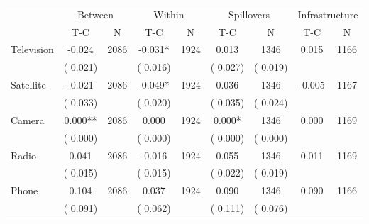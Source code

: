 
\begin{tabular}{l*{8}{c}}\hline&\multicolumn{2}{c}{Between}&\multicolumn{2}{c}{Within}&\multicolumn{2}{c}{Spillovers}&\multicolumn{2}{c}{Infrastructure}\\ \cmidrule(r){2-3}\cmidrule(l){4-5}\cmidrule(l){6-7}\cmidrule(l){8-9} & {T-C} & {N} & {T-C} & {N}  & {T-C}  & {N} & {T-C}  & {N} \\ \midrule
Television        &             -0.024      &       2086       &             -0.031*      &       1924       &              0.013      &       1346  &        0.015 &       1166       \\
                       &       (       0.021)            &                               &       (       0.016)            &                               &       (       0.027)            &       (       0.019) &                  \\
Satellite        &             -0.021      &       2086       &             -0.049*      &       1924       &              0.036      &       1346  &       -0.005 &       1167       \\
                       &       (       0.033)            &                               &       (       0.020)            &                               &       (       0.035)            &       (       0.024) &                  \\
Camera        &              0.000**      &       2086       &              0.000      &       1924       &              0.000*      &       1346  &        0.000 &       1169       \\
                       &       (       0.000)            &                               &       (       0.000)            &                               &       (       0.000)            &       (       0.000) &                  \\
Radio        &              0.041      &       2086       &             -0.016      &       1924       &              0.055      &       1346  &        0.011 &       1169       \\
                       &       (       0.015)            &                               &       (       0.015)            &                               &       (       0.022)            &       (       0.019) &                  \\
Phone        &              0.104      &       2086       &              0.037      &       1924       &              0.090      &       1346  &        0.090 &       1166       \\
                       &       (       0.091)            &                               &       (       0.062)            &                               &       (       0.111)            &       (       0.076) &                  \\
\hline \end{tabular}